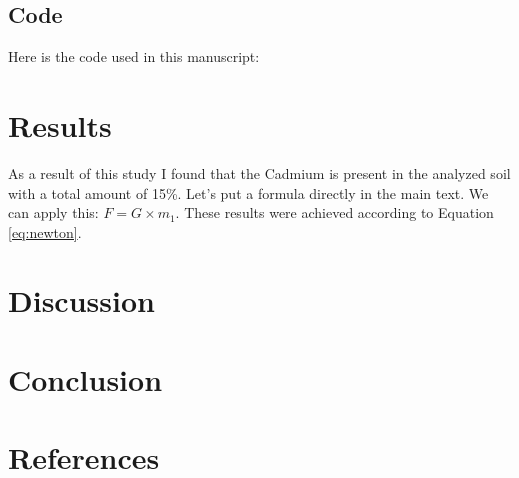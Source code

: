 \subsection{Code}
Here is the code used in this manuscript:



\section{Results}

As a result of this study I found that the Cadmium is present in the analyzed soil with a total amount of 15\%.
Let's put a formula directly in the main text. We can apply this: $F=G \times m_{1}$. These results were achieved according to Equation \ref{eq:newton}.



\section{Discussion}

\section{Conclusion}

\section{References}





